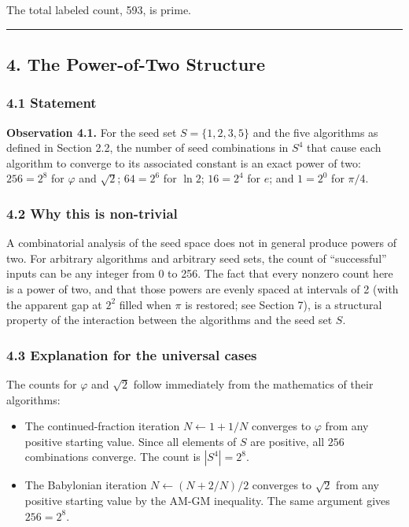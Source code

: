 \documentclass[
  11pt,
  letterpaper,
]{article}
\begin{document}
The total labeled count, 593, is prime.

\begin{center}\rule{0.5\linewidth}{0.5pt}\end{center}

\subsection{4. The Power-of-Two
Structure}\label{the-power-of-two-structure}

\subsubsection{4.1 Statement}\label{statement}

\textbf{Observation 4.1.} For the seed set \(S = \{1, 2, 3, 5\}\) and
the five algorithms as defined in Section 2.2, the number of seed
combinations in \(S^4\) that cause each algorithm to converge to its
associated constant is an exact power of two: \(256 = 2^8\) for
\(\varphi\) and \(\sqrt{2}\); \(64 = 2^6\) for \(\ln 2\); \(16 = 2^4\)
for \(e\); and \(1 = 2^0\) for \(\pi/4\).

\subsubsection{4.2 Why this is
non-trivial}\label{why-this-is-non-trivial}

A combinatorial analysis of the seed space does not in general produce
powers of two. For arbitrary algorithms and arbitrary seed sets, the
count of ``successful'' inputs can be any integer from 0 to 256. The
fact that every nonzero count here is a power of two, and that those
powers are evenly spaced at intervals of 2 (with the apparent gap at
\(2^2\) filled when \(\pi\) is restored; see Section 7), is a structural
property of the interaction between the algorithms and the seed set
\(S\).

\subsubsection{4.3 Explanation for the universal
cases}\label{explanation-for-the-universal-cases}

The counts for \(\varphi\) and \(\sqrt{2}\) follow immediately from the
mathematics of their algorithms:

\begin{itemize}
\item
  The continued-fraction iteration \(N \leftarrow 1 + 1/N\) converges to
  \(\varphi\) from any positive starting value. Since all elements of
  \(S\) are positive, all \(256\) combinations converge. The count is
  \(|S^4| = 2^8\).
\item
  The Babylonian iteration \(N \leftarrow (N + 2/N)/2\) converges to
  \(\sqrt{2}\) from any positive starting value by the AM-GM inequality.
  The same argument gives \(256 = 2^8\).
\end{itemize}
\end{document}
